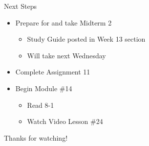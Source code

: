\documentclass[t, aspectratio=169]{beamer}
\newcommand{\?}{\stackrel{?}{=}}
\begin{document}
	\begin{frame}{Next Steps}
		\begin{itemize}
			\item Prepare for and take Midterm 2 \begin{itemize}
				\item Study Guide posted in Week 13 section
				\item Will take next Wednesday
			\end{itemize}
			\item Complete Assignment 11
			\item Begin Module \#14 \begin{itemize}
				\item Read 8-1
				\item Watch Video Lesson \#24
			\end{itemize}
		\end{itemize}
	
		\vfill
		
		Thanks for watching!
	\end{frame}
	
\end{document}
